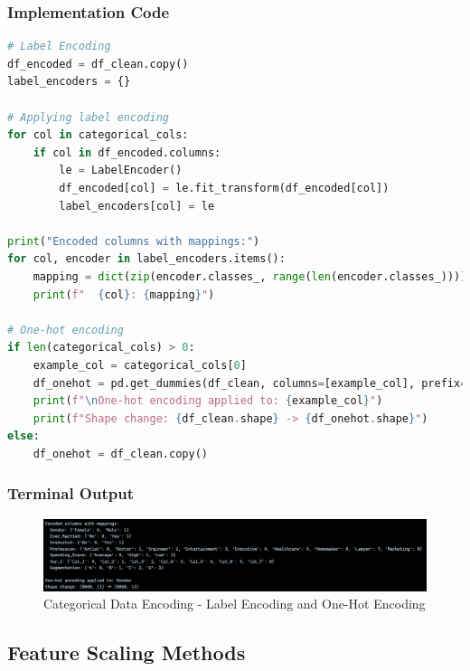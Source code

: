 \documentclass[12pt,a4paper]{article}
\begin{document}
\subsubsection{Implementation Code}
\begin{lstlisting}[language=Python, caption=Categorical Data Encoding - Label Encoding and One-Hot Encoding]
# Label Encoding
df_encoded = df_clean.copy()
label_encoders = {}

# Applying label encoding
for col in categorical_cols:
    if col in df_encoded.columns:
        le = LabelEncoder()
        df_encoded[col] = le.fit_transform(df_encoded[col])
        label_encoders[col] = le

print("Encoded columns with mappings:")
for col, encoder in label_encoders.items():
    mapping = dict(zip(encoder.classes_, range(len(encoder.classes_))))
    print(f"  {col}: {mapping}")

# One-hot encoding
if len(categorical_cols) > 0:
    example_col = categorical_cols[0]
    df_onehot = pd.get_dummies(df_clean, columns=[example_col], prefix=example_col)
    print(f"\nOne-hot encoding applied to: {example_col}")
    print(f"Shape change: {df_clean.shape} -> {df_onehot.shape}")
else:
    df_onehot = df_clean.copy()
\end{lstlisting}

\subsubsection{Terminal Output}

\begin{figure}[h!]
\centering
    \includegraphics[width=\textwidth]{Figures/encoding_output.png}
    \caption{Categorical Data Encoding - Label Encoding and One-Hot Encoding}
\end{figure}

\subsection{Feature Scaling Methods}
\end{document}
